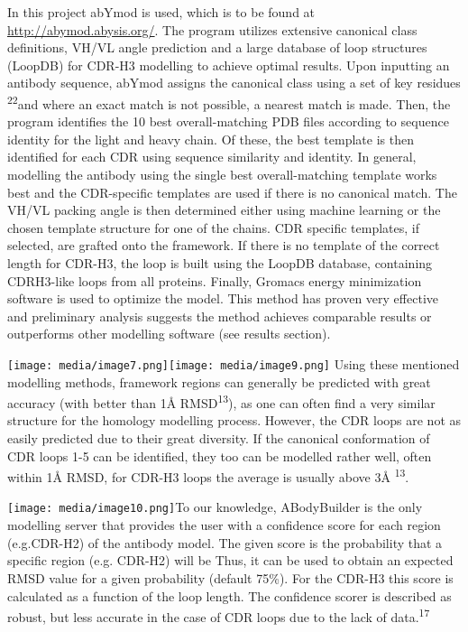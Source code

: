 \documentclass[
]{article}
\begin{document}
In this project abYmod is used, which is to be found at
\url{http://abymod.abysis.org/}. The program utilizes extensive
canonical class definitions, VH/VL angle prediction and a large database
of loop structures (LoopDB) for CDR-H3 modelling to achieve optimal
results. Upon inputting an antibody sequence, abYmod assigns the
canonical class using a set of key residues \textsuperscript{22}and
where an exact match is not possible, a nearest match is made. Then, the
program identifies the 10 best overall-matching PDB files according to
sequence identity for the light and heavy chain. Of these, the best
template is then identified for each CDR using sequence similarity and
identity. In general, modelling the antibody using the single best
overall-matching template works best and the CDR-specific templates are
used if there is no canonical match. The VH/VL packing angle is then
determined either using machine learning or the chosen template
structure for one of the chains. CDR specific templates, if selected,
are grafted onto the framework. If there is no template of the correct
length for CDR-H3, the loop is built using the LoopDB database,
containing CDRH3-like loops from all proteins. Finally, Gromacs energy
minimization software is used to optimize the model. This method has
proven very effective and preliminary analysis suggests the method
achieves comparable results or outperforms other modelling software (see
results section).

\texttt{[image: media/image7.png]}\texttt{[image: media/image9.png]}
Using these mentioned modelling methods, framework regions can generally
be predicted with great accuracy (with better than 1Å
RMSD\textsuperscript{13}), as one can often find a very similar
structure for the homology modelling process. However, the CDR loops are
not as easily predicted due to their great diversity. If the canonical
conformation of CDR loops 1-5 can be identified, they too can be
modelled rather well, often within 1Å RMSD, for CDR-H3 loops the average
is usually above 3Å \textsuperscript{13}.

\texttt{[image: media/image10.png]}To
our knowledge, ABodyBuilder is the only modelling server that provides
the user with a confidence score for each region (e.g.CDR-H2) of the
antibody model. The given score is the probability that a specific
region (e.g. CDR-H2) will be Thus, it can be used to obtain an expected
RMSD value for a given probability (default 75\%). For the CDR-H3 this
score is calculated as a function of the loop length. The confidence
scorer is described as robust, but less accurate in the case of CDR
loops due to the lack of data.\textsuperscript{17}
\end{document}
